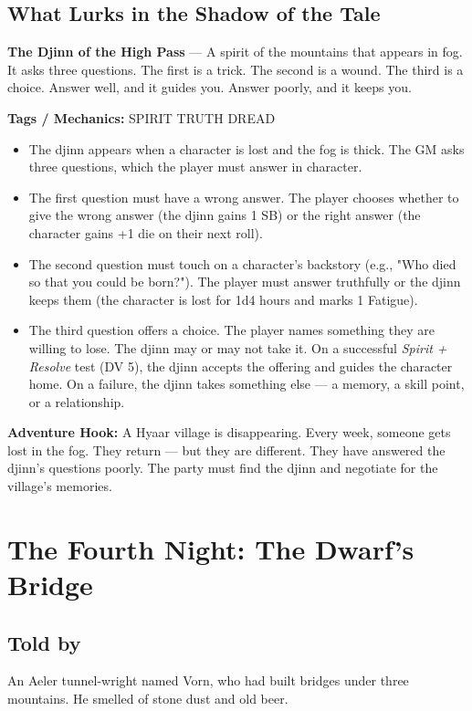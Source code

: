 \documentclass[10pt,twoside]{book}
\newcommand{\tag}[1]{\textsc{#1}}
\begin{document}
\section*{What Lurks in the Shadow of the Tale}
\begin{infobox}
\textbf{The Djinn of the High Pass} --- A spirit of the mountains that appears in fog. It asks three questions. The first is a trick. The second is a wound. The third is a choice. Answer well, and it guides you. Answer poorly, and it keeps you.

\textbf{Tags / Mechanics:} \tag{SPIRIT} \tag{TRUTH} \tag{DREAD}

\begin{itemize}
\item The djinn appears when a character is lost and the fog is thick. The GM asks three questions, which the player must answer in character.
\item The first question must have a wrong answer. The player chooses whether to give the wrong answer (the djinn gains 1 SB) or the right answer (the character gains +1 die on their next roll).
\item The second question must touch on a character's backstory (e.g., "Who died so that you could be born?"). The player must answer truthfully or the djinn keeps them (the character is lost for 1d4 hours and marks 1 Fatigue).
\item The third question offers a choice. The player names something they are willing to lose. The djinn may or may not take it. On a successful \textit{Spirit + Resolve} test (DV 5), the djinn accepts the offering and guides the character home. On a failure, the djinn takes something else --- a memory, a skill point, or a relationship.
\end{itemize}

\textbf{Adventure Hook:} A Hyaar village is disappearing. Every week, someone gets lost in the fog. They return --- but they are different. They have answered the djinn's questions poorly. The party must find the djinn and negotiate for the village's memories.
\end{infobox}

\chapter{The Fourth Night: The Dwarf's Bridge}

\section*{Told by}
An Aeler tunnel-wright named Vorn, who had built bridges under three mountains. He smelled of stone dust and old beer.
\end{document}
